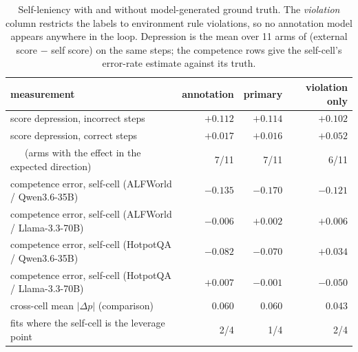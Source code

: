 \begin{table}[t]
\centering
\small
\caption{Self-leniency with and without model-generated ground truth. The \emph{violation} column restricts the labels to environment rule violations, so no annotation model appears anywhere in the loop. Depression is the mean over 11 arms of (external score $-$ self score) on the same steps; the competence rows give the self-cell's error-rate estimate against its truth.}\label{tab:leniencycertain}
\begin{tabular}{lrrr}
\toprule
measurement & annotation & primary & violation only \\
\midrule
score depression, incorrect steps & $+0.112$ & $+0.114$ & $+0.102$ \\
score depression, correct steps & $+0.017$ & $+0.016$ & $+0.052$ \\
\ \ \ (arms with the effect in the expected direction) & 7/11 & 7/11 & 6/11 \\
\midrule
competence error, self-cell (ALFWorld / Qwen3.6-35B) & $-0.135$ & $-0.170$ & $-0.121$ \\
competence error, self-cell (ALFWorld / Llama-3.3-70B) & $-0.006$ & $+0.002$ & $+0.006$ \\
competence error, self-cell (HotpotQA / Qwen3.6-35B) & $-0.082$ & $-0.070$ & $+0.034$ \\
competence error, self-cell (HotpotQA / Llama-3.3-70B) & $+0.007$ & $-0.001$ & $-0.050$ \\
cross-cell mean $|\Delta p|$ (comparison) & 0.060 & 0.060 & 0.043 \\
\midrule
fits where the self-cell is the leverage point & 2/4 & 1/4 & 2/4 \\
\bottomrule
\end{tabular}
\end{table}
